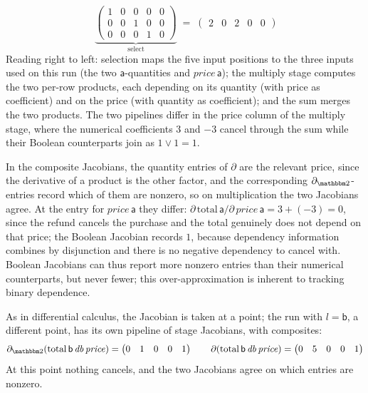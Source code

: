 \begin{example}
\begin{displaymath}
    \;
    \underbrace{\begin{pmatrix} 1 & 0 & 0 & 0 & 0 \\ 0 & 0 & 1 & 0 & 0 \\ 0 & 0 & 0 & 1 & 0 \end{pmatrix}}_{\text{select}}
    \;=\;
    \begin{pmatrix} 2 & 0 & 2 & 0 & 0 \end{pmatrix}
  \end{displaymath}
  Reading right to left: selection maps the five input positions to the three inputs used on this run (the two
  $\mathsf{a}$-quantities and $\mathit{price}\,\mathsf{a}$); the multiply stage computes the two per-row
  products, each depending on its quantity (with price as coefficient) and on the price (with quantity as
  coefficient); and the sum merges the two products. The two pipelines differ in the price column of the
  multiply stage, where the numerical coefficients $3$ and $-3$ cancel through the sum while their Boolean
  counterparts join as $1 \vee 1 = 1$.

  In the composite Jacobians, the quantity entries of $\partial$ are the relevant price, since the derivative
  of a product is the other factor, and the corresponding $\partial_{\Two}$-entries record which of them are
  nonzero, so on multiplication the two Jacobians agree. At the entry for $\mathit{price}\,\mathsf{a}$ they
  differ: $\partial\,\mathrm{total}\,\mathsf{a} / \partial\,\mathit{price}\,\mathsf{a} = 3 + (-3) = 0$, since
  the refund cancels the purchase and the total genuinely does not depend on that price; the Boolean Jacobian
  records $1$, because dependency information combines by disjunction and there is no negative dependency to
  cancel with. Boolean Jacobians can thus report more nonzero entries than their numerical counterparts, but
  never fewer; this over-approximation is inherent to tracking binary dependence.

  As in differential calculus, the Jacobian is taken at a point; the run with $l = \mathsf{b}$, a different
  point, has its own pipeline of stage Jacobians, with composites:
  \begin{displaymath}
    \partial_{\Two}(\mathrm{total}\,\mathsf{b}\,\mathit{db}\,\mathit{price}) =
    \begin{pmatrix} 0 & 1 & 0 & 0 & 1 \end{pmatrix}
    \qquad
    \partial(\mathrm{total}\,\mathsf{b}\,\mathit{db}\,\mathit{price}) =
    \begin{pmatrix} 0 & 5 & 0 & 0 & 1 \end{pmatrix}
  \end{displaymath}
  At this point nothing cancels, and the two Jacobians agree on which entries are nonzero.


\end{example}

